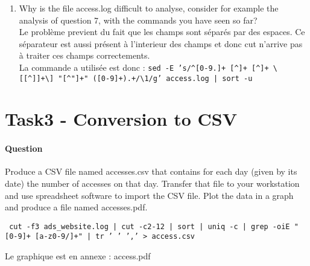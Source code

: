 \documentclass[a4paper,11pt]{article}
\newcounter{commande}[subsection]
\newcommand{\question}[1]{\addtocounter{commande}{1}\paragraph{Question \arabic{commande}}#1\;}
\begin{document}
\begin{enumerate}
  
  \item Why is the file access.log difficult to analyse, consider for example the analysis of question 7, with the commands you have seen so far?  \\
  Le problème previent du fait que les champs sont séparés par des espaces. Ce séparateur est aussi présent à l'interieur des champs et donc cut n'arrive pas à traiter ces champs correctements. \\
  La commande a utilisée est donc :
%
  \texttt{sed -E 's/\textasciicircum[0-9.]+ [\textasciicircum ]+ [\textasciicircum ]+ \textbackslash[[\textasciicircum]]+\textbackslash] "[\textasciicircum"]+" ([0-9]+).+/\textbackslash1/g' access.log | sort -u}

  
\end{enumerate}


\section{Task3 - Conversion to CSV}
\question{Produce a CSV file named accesses.csv that contains for each day (given by its date) the number of accesses on that day. Transfer that file to your workstation and use spreadsheet software to import the CSV file. Plot the data in a graph and produce a file named accesses.pdf.}

\texttt{ cut -f3 ads\_website.log | cut -c2-12 | sort | uniq -c | grep -oiE "[0-9]+ [a-z0-9/]+" | tr ' ' ',' > access.csv}

Le graphique est en annexe : access.pdf
\end{document}
